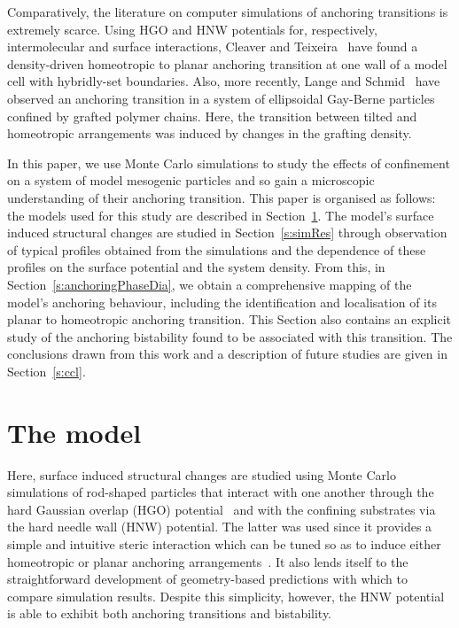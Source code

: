 \documentclass[aps,10pt,twocolumn]{revtex4}
\begin{document}
Comparatively, the
literature on computer simulations of anchoring transitions is extremely scarce. Using HGO and HNW potentials for,
respectively, intermolecular and surface interactions, Cleaver and Teixeira~\cite{Cleaver_Teixeira_01} have found
a density-driven homeotropic to planar anchoring transition at one wall of a model cell with hybridly-set
boundaries. Also, more recently, Lange and Schmid~\cite{LangeSchmid02,LangeSchmid02a,LangeSchmid02c} have observed
an anchoring transition in a system of ellipsoidal Gay-Berne particles confined by grafted polymer chains. Here,
the transition between tilted and homeotropic arrangements was induced by changes in the grafting density.

In this paper, we use Monte Carlo simulations to study the effects of confinement on a system of model mesogenic
particles and so gain a microscopic understanding of their anchoring transition. This paper is organised as
follows: the models used for this study are described in Section~\ref{s:models}. The model's surface induced
structural changes are studied in Section~\ref{s:simRes} through observation of typical profiles obtained from the
simulations and the dependence of these profiles on the surface potential and the system density. From this, in
Section~\ref{s:anchoringPhaseDia}, we obtain a comprehensive mapping of the model's anchoring behaviour, including
the identification and localisation of its planar to homeotropic anchoring transition. This Section also contains
an explicit study of the anchoring bistability found to be associated with this transition. The conclusions drawn
from this work and a description of future studies are given in Section~\ref{s:ccl}.


\section{The model}
\label{s:models}

Here, surface induced structural changes are studied using Monte Carlo simulations of rod-shaped
particles that  interact with one another through the hard Gaussian overlap (HGO)
potential~\cite{Rigby89} and with the confining  substrates via the hard needle wall (HNW)
potential. The latter was used since it  provides a simple and
intuitive steric interaction which can be tuned so as to induce either homeotropic or planar
anchoring arrangements~\cite{Chrzanowska_Teixera_01,Cleaver_Teixeira_01}. It also lends itself
to the straightforward development of
geometry-based predictions with  which to compare simulation results. Despite this simplicity,
however, the HNW potential is able to exhibit both  anchoring transitions and bistability.
\end{document}
